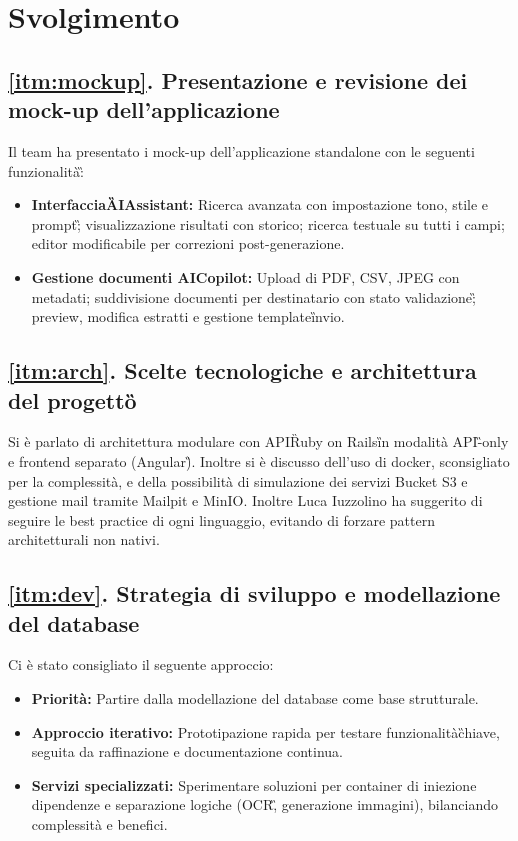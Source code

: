 \documentclass[a4paper,12pt]{article}
\begin{document}
\newpage
\section{Svolgimento}

\subsection*{\ref{itm:mockup}. Presentazione e revisione dei mock-up dell'applicazione}

Il team ha presentato i mock-up dell'applicazione standalone con le seguenti funzionalità\G:
\begin{itemize}
    \item \textbf{Interfaccia\G AIAssistant:} Ricerca avanzata con impostazione tono, stile e prompt\G; visualizzazione risultati con storico; 
    ricerca testuale su tutti i campi; editor modificabile per correzioni post-generazione.
    \item \textbf{Gestione documenti AICopilot:} Upload di PDF, CSV, JPEG con metadati; suddivisione documenti per destinatario con 
    stato validazione\G; preview, modifica estratti e gestione template\G invio.
\end{itemize}

\subsection*{\ref{itm:arch}. Scelte tecnologiche e architettura del progetto\G}

Si è parlato di architettura modulare con API\G Ruby on Rails\G in modalità API\G-only e 
frontend separato (Angular\G). Inoltre si è discusso dell'uso di docker, sconsigliato per la complessità,
e della possibilità di simulazione dei servizi Bucket S3 e gestione mail tramite Mailpit e MinIO.
Inoltre Luca Iuzzolino ha suggerito di seguire le best practice di ogni linguaggio, evitando di forzare pattern 
architetturali non nativi.


\subsection*{\ref{itm:dev}. Strategia di sviluppo e modellazione del database}
Ci è stato consigliato il seguente approccio:
\begin{itemize}
    \item \textbf{Priorità:} Partire dalla modellazione del database come base strutturale.
    \item \textbf{Approccio iterativo:} Prototipazione rapida per testare funzionalità\G chiave, seguita da raffinazione e documentazione continua.
    \item \textbf{Servizi specializzati:} Sperimentare soluzioni per container di iniezione dipendenze e separazione logiche (OCR\G, generazione immagini), bilanciando complessità e benefici.
\end{itemize}
\end{document}

